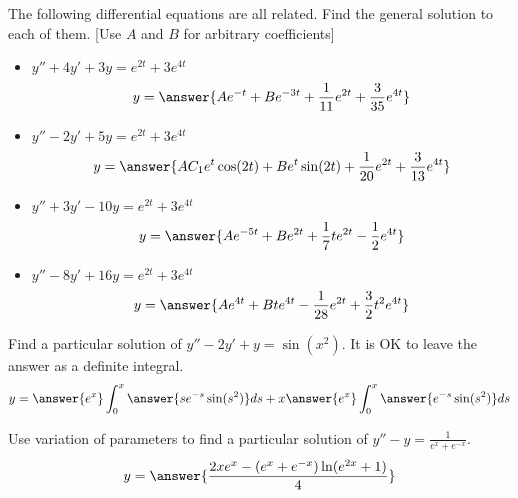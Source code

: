 \documentclass{ximera}
\begin{document}
\begin{exercise}
    The following differential equations are all related. Find the general solution to each of them. [Use $A$ and $B$ for arbitrary coefficients]%
    \begin{itemize}
        \item $y'' + 4y' + 3y = e^{2t} + 3e^{4t}$ 
        \[
            y = \answer{Ae^{-t} + Be^{-3t} + \frac{1}{11}e^{2t} + \frac{3}{35}e^{4t}}
        \]
        \item $y'' - 2y' + 5y = e^{2t} + 3e^{4t}$
        \[
            y = \answer{AC_1e^{t}\cos(2t) + Be^t\sin(2t) + \frac{1}{20}e^{2t} + \frac{3}{13}e^{4t}}
        \]
        \item $y'' + 3y' - 10y = e^{2t} + 3e^{4t}$
        \[
            y = \answer{Ae^{-5t} + Be^{2t} + \frac{1}{7}te^{2t} - \frac{1}{2}e^{4t}}
        \]
        \item $y'' - 8y'  + 16y = e^{2t} + 3e^{4t}$
        \[
            y = \answer{Ae^{4t} + Bte^{4t} - \frac{1}{28}e^{2t} + \frac{3}{2}t^2e^{4t}}
        \]
    \end{itemize}
\end{exercise}

\begin{exercise}
    Find a particular solution of $y''-2y' +y = \sin (x^2)$.  It is OK to leave the answer as a definite integral.
    \[
        y = \answer{e^x}\int_0^x \answer{se^{-s}\sin(s^2)} ds + x\answer{e^x}\int_0^x \answer{e^{-s}\sin(s^2)} ds
    \]
\end{exercise}

\begin{exercise}
    Use variation of parameters to find a particular solution of $y''-y = \frac{1}{e^x+e^{-x}}$.
    \[
        y = \answer{\frac{2xe^x-(e^x+e^{-x})\log(e^{2x}+1)}{4}}
    \]
\end{exercise}
\end{document}
